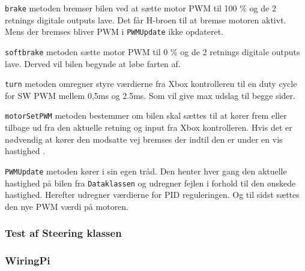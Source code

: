 \texttt{brake} metoden bremser bilen ved at sætte motor PWM til 100 \% og de 2 retnings digitale outputs lave. Det får H-broen til at bremse motoren aktivt. Mens der bremses bliver PWM i \texttt{PWMUpdate} ikke opdateret.


\texttt{softbrake} metoden sætte motor PWM til 0 \% og de 2 retnings digitale outputs lave. 
Derved vil bilen begynde at løbe farten af.


\texttt{turn} metoden omregner styre værdierne fra Xbox kontrolleren til en duty cycle for SW PWM mellem 0,5ms og 2.5ms. 
Som vil give max udslag til begge sider. 


\texttt{motorSetPWM} metoden bestemmer om bilen skal sættes til at kører frem eller tilbage ud fra den aktuelle retning og input fra Xbox kontrolleren. 
Hvis det er nødvendig at kører den modsatte vej bremses der indtil den er under en vis hastighed
. 


\texttt{PWMUpdate} metoden kører i sin egen tråd. Den henter hver gang den aktuelle hastighed på bilen fra \texttt{Dataklassen} og udregner fejlen i forhold til den ønskede hastighed. Herefter udregner værdierne for PID reguleringen. Og til sidst sættes den nye PWM værdi på motoren. 


\subsubsection{Test af Steering klassen}



\subsubsection*{WiringPi} \label{sec:wiringPi_impl}